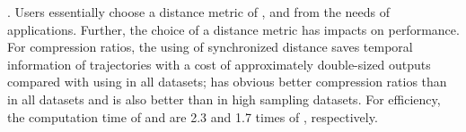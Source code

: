 . Users essentially choose a distance metric of \ped, \sed and \dad from the needs of applications. Further, the choice of a distance metric has impacts on performance.
For compression ratios, the using of synchronized distance \sed saves temporal information of trajectories with a cost of approximately double-sized outputs compared with using \ped in all datasets; \ped has obvious better compression ratios than \dad in all datasets and \sed is also better than \dad in high sampling datasets.
For efficiency, the computation time of \ped and \sed are 2.3 and 1.7 times of \dad, respectively.



%
%
